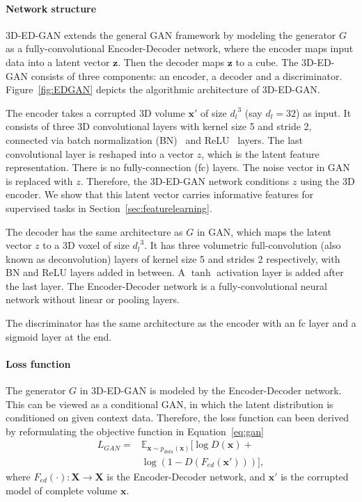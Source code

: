 \documentclass[10pt,twocolumn,letterpaper]{article}
\begin{document}
\paragraph*{Network structure} 3D-ED-GAN extends the general GAN framework by modeling the generator $G$ as a fully-convolutional Encoder-Decoder network, where the encoder maps input data into a latent vector $\mathbf{z}$. Then the decoder maps $\mathbf{z}$ to a cube. The 3D-ED-GAN consists of three components: an encoder, a decoder and a discriminator. Figure~\ref{fig:EDGAN} depicts the algorithmic architecture of 3D-ED-GAN.


The encoder takes a corrupted 3D volume $\mathbf{x}'$ of size ${d_l}^3$ (say $d_l = 32$) as input. It consists of three 3D convolutional layers with kernel size 5 and stride 2, connected via batch normalization (BN)~\cite{bn} and ReLU~\cite{prelu} layers. The last convolutional layer is reshaped into a vector $z$, which is the latent feature representation. There is no fully-connection (fc) layers. The noise vector in GAN is replaced with $z$. Therefore, the 3D-ED-GAN network conditions $z$ using the 3D encoder. We show that this latent vector carries informative features for supervised tasks in Section~\ref{sec:featurelearning}.

The decoder has the same architecture as $G$ in GAN, which maps the latent vector $z$ to a 3D voxel of size ${d_l}^3$. It has three volumetric full-convolution (also known as deconvolution) layers of kernel size 5 and strides 2 respectively, with BN and ReLU layers added in between. A $\tanh$ activation layer is added after the last layer. The Encoder-Decoder network is a fully-convolutional neural network without linear or pooling layers.

The discriminator has the same architecture as the encoder with an fc layer and a sigmoid layer at the end. 

\paragraph*{Loss function} The generator $G$ in 3D-ED-GAN is modeled by the Encoder-Decoder network. This can be viewed as a conditional GAN, in which the latent distribution is conditioned on given context data. Therefore, the loss function can been derived by reformulating the objective function in Equation~\ref{eq:gan}
  \begin{align}
L_{GAN}= &\mathbb{E}_{\mathbf{x} \sim p_{data}(\mathbf{x})}[\log D(\mathbf{x})+ \nonumber\\
&\log (1-D(F_{ed}(\mathbf{x}')))], \label{eq:3dgan}
  \end{align}
where $F_{ed}(\cdot): \mathbf{X} \rightarrow \mathbf{X}$ is the Encoder-Decoder network, and $\mathbf{x}'$ is the corrupted model of complete volume $\mathbf{x}$.
\end{document}
